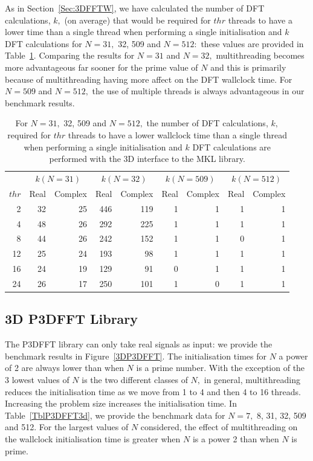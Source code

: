 \documentclass[a4paper]{article}
\begin{document}
As in Section~\ref{Sec:3DFFTW}, we have calculated the number of DFT
calculations, $k,$ (on average) that would be required for $thr$
threads to have a lower time than a single thread when performing a
single initialisation and $k$ DFT calculations for $N=31,$ 32, 509 and
$N=512:$ these values are provided in
Table~\ref{TblMKL3dk}. Comparing the results for $N=31$ and $N=32,$
multithreading becomes more advantageous far sooner for the prime
value of $N$ and this is primarily because of multithreading having
more affect on the DFT wallclock time. For $N=509$ and $N=512,$ the
use of multiple threads is always advantageous in our benchmark
results.


\begin{table}
\begin{center}
\begin{tabular}{|r||r|r||r|r||r|r||r|r|}
  \hline
  & \multicolumn{2}{|c||}{$k(N=31)$} & \multicolumn{2}{|c||}{$k(N=32)$} & \multicolumn{2}{|c||}{$k(N=509)$} & \multicolumn{2}{|c|}{$k(N=512)$} \\
  $thr$ &  Real & Complex &  Real & Complex &  Real & Complex &  Real & Complex  \\ \hline
  2 & 32    & 25  & 446   & 119  & 1 &  1   & 1  &  1 \\
  4 & 48    & 26  & 292   & 225  & 1 &  1   & 1  &  1 \\
  8 & 44    & 26  & 242   & 152  & 1 &  1   & 0  &  1 \\
  12 & 25   & 24  & 193   & 98   & 1 &  1   & 1  &  1 \\
  16 & 24   & 19  & 129   & 91   & 0 &  1   & 1  &  1 \\
  24 & 26   & 17  & 250   & 101  & 1 &  0   & 1  &  1 \\ \hline
\end{tabular}
\caption{For $N=31,$ 32, 509 and $N=512,$ the number of DFT
  calculations, $k,$ required for $thr$ threads to have a lower 
  wallclock time than a single thread when performing a single
  initialisation and $k$ DFT calculations are performed with the 3D
  interface to the MKL library.}\label{TblMKL3dk}
\end{center}
\end{table}


\subsection{3D P3DFFT Library}\label{Sec:3DP3DFFT}
The P3DFFT library can only take real signals as input: we provide the
benchmark results in Figure~\ref{3DP3DFFT}. The initialisation times
for $N$ a power of 2 are always lower than when $N$ is a prime
number. With the exception of the 3 lowest values of $N$ is the two
different classes of $N,$ in general, multithreading reduces the
initialisation time as we move from 1 to 4 and then 4 to 16
threads. Increasing the problem size increases the initialisation
time. In Table~\ref{TblP3DFFT3d}, we provide the benchmark data for
$N=7,$ 8, 31, 32, 509 and 512. For the largest values of $N$
considered, the effect of multithreading on the wallclock
initialisation time is greater when $N$ is a power 2 than when $N$ is
prime.
\end{document}
